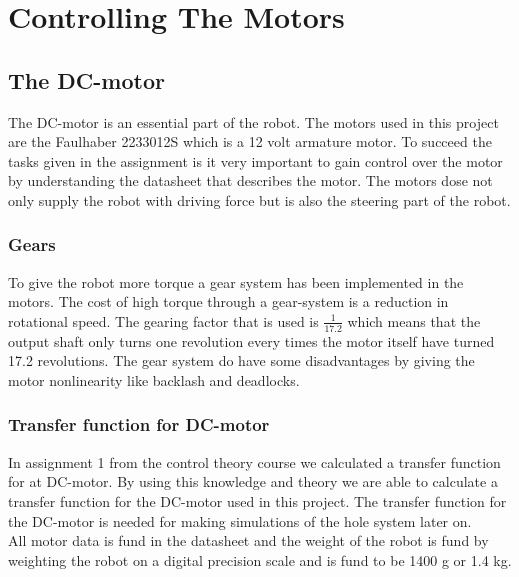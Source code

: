 \chapter{Controlling The Motors}
\label{ch:motors}


\section {The DC-motor}

The DC-motor is an essential part of the robot. The motors used in this project are the Faulhaber 2233012S which is a 12 volt armature motor.  To succeed the tasks given in the assignment is it very important to gain control over the motor by understanding the datasheet that describes the motor. The motors dose not only supply the robot with driving force but is also the steering part of the robot.

\subsection{Gears}
To give the robot more torque a gear system has been implemented in the motors. The cost of high torque through a gear-system is a reduction in rotational speed. The gearing factor that is used is $\frac{1}{17.2}$ which means that the output shaft only turns one revolution every times the motor itself have turned 17.2 revolutions. The gear system do have some disadvantages by giving the motor nonlinearity like backlash and deadlocks. 

\subsection{Transfer function for DC-motor}
In assignment 1 from the control theory course we calculated a transfer function for at DC-motor. By using this knowledge and theory we are able to calculate a transfer function for the DC-motor used in this project.
The transfer function for the DC-motor is needed for making simulations of the hole system later on.\\
All motor data is fund in the datasheet and the weight of the robot is fund by weighting the robot on a digital precision scale and is fund to be 1400 g or 1.4 kg. \\

